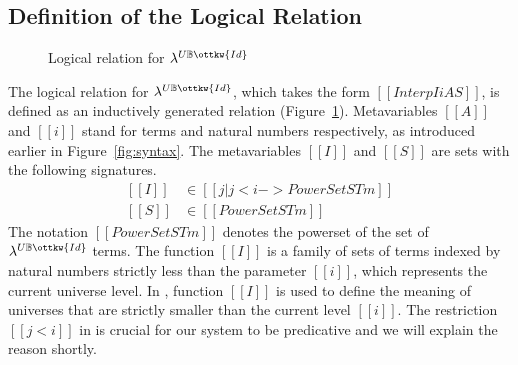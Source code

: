 \documentclass[acmsmall,screen=true,
\ifpublic review=false\else,review=true\fi
  ,anonymous=\ifanonymous true\else false\fi]{acmart}
\newcommand{\lang}{$\lambda^{U\mathbb{B}\ottkw{Id}}$\xspace}
\newcommand{\scw}[1]{}
\newcommand{\yl}[1]{}
\begin{document}
\subsection{Definition of the Logical Relation}
\begin{figure}[h]
\caption{Logical relation for \lang}
\label{fig:logrel}
\end{figure}
The logical relation for \lang{}, which takes the form $[[Interp I i A
S]]$, is defined as an inductively generated relation (Figure~\ref{fig:logrel}).
Metavariables $[[A]]$ and $[[i]]$ stand for terms and natural
numbers respectively, as introduced earlier in
Figure~\ref{fig:syntax}.
The metavariables $[[I]]$ and $[[S]]$ are
sets with the following signatures.
\begin{equation*}
  \begin{split}
    [[I]] &\in [[ { j | j < i  } ->  PowerSet STm ]] \\
    [[S]] &\in [[PowerSet STm]]
  \end{split}
\end{equation*}
The notation $[[PowerSet STm]]$ denotes the powerset of the set of
\lang{} terms.
The function $[[I]]$ is a family of sets of terms indexed by
natural numbers strictly less than the parameter $[[i]]$, which
represents the current universe level.  In , function
$[[I]]$ is used to define the meaning of
universes that are strictly smaller than the current level $[[i]]$. The
restriction $[[j < i]]$ in  is crucial for our system to
be predicative and we will explain the reason shortly.
\end{document}
